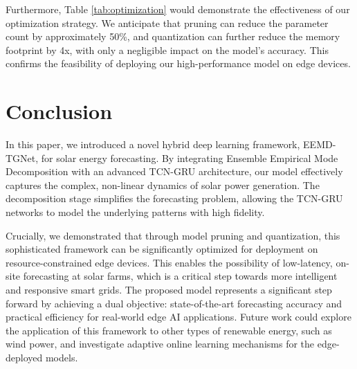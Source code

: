 \documentclass[conference]{IEEEtran}
\begin{document}
Furthermore, Table \ref{tab:optimization} would demonstrate the effectiveness of our optimization strategy. We anticipate that pruning can reduce the parameter count by approximately 50\%, and quantization can further reduce the memory footprint by 4x, with only a negligible impact on the model's accuracy. This confirms the feasibility of deploying our high-performance model on edge devices.

\section{Conclusion}
In this paper, we introduced a novel hybrid deep learning framework, EEMD-TGNet, for solar energy forecasting. By integrating Ensemble Empirical Mode Decomposition with an advanced TCN-GRU architecture, our model effectively captures the complex, non-linear dynamics of solar power generation. The decomposition stage simplifies the forecasting problem, allowing the TCN-GRU networks to model the underlying patterns with high fidelity.

Crucially, we demonstrated that through model pruning and quantization, this sophisticated framework can be significantly optimized for deployment on resource-constrained edge devices. This enables the possibility of low-latency, on-site forecasting at solar farms, which is a critical step towards more intelligent and responsive smart grids. The proposed model represents a significant step forward by achieving a dual objective: state-of-the-art forecasting accuracy and practical efficiency for real-world edge AI applications. Future work could explore the application of this framework to other types of renewable energy, such as wind power, and investigate adaptive online learning mechanisms for the edge-deployed models.
\end{document}
